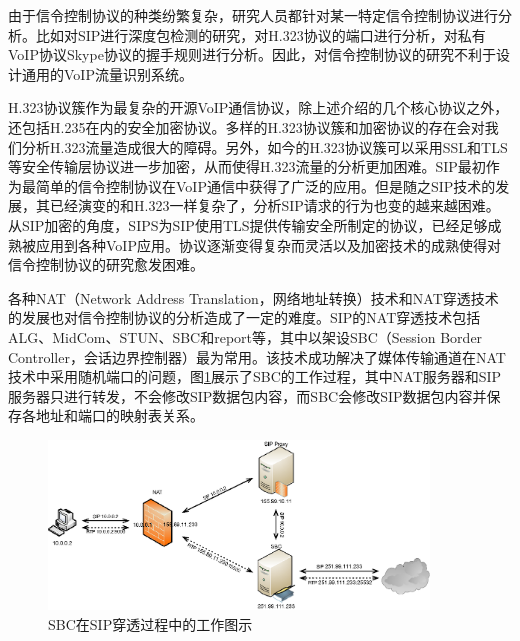 由于信令控制协议的种类纷繁复杂，研究人员都针对某一特定信令控制协议进行分析。比如对SIP进行深度包检测的研究，对H.323协议的端口进行分析，对私有VoIP协议Skype协议的握手规则进行分析。因此，对信令控制协议的研究不利于设计通用的VoIP流量识别系统。

H.323协议簇作为最复杂的开源VoIP通信协议，除上述介绍的几个核心协议之外，还包括H.235在内的安全加密协议。多样的H.323协议簇和加密协议的存在会对我们分析H.323流量造成很大的障碍。另外，如今的H.323协议簇可以采用SSL和TLS等安全传输层协议进一步加密，从而使得H.323流量的分析更加困难。SIP最初作为最简单的信令控制协议在VoIP通信中获得了广泛的应用。但是随之SIP技术的发展，其已经演变的和H.323一样复杂了，分析SIP请求的行为也变的越来越困难。从SIP加密的角度，SIPS为SIP使用TLS提供传输安全所制定的协议，已经足够成熟被应用到各种VoIP应用。协议逐渐变得复杂而灵活以及加密技术的成熟使得对信令控制协议的研究愈发困难。

各种NAT（Network Address Translation，网络地址转换）技术和NAT穿透技术的发展也对信令控制协议的分析造成了一定的难度。SIP的NAT穿透技术包括ALG、MidCom、STUN、SBC和report等，其中以架设SBC（Session Border Controller，会话边界控制器）最为常用。该技术成功解决了媒体传输通道在NAT技术中采用随机端口的问题，图\ref{fig:sbc}展示了SBC的工作过程，其中NAT服务器和SIP服务器只进行转发，不会修改SIP数据包内容，而SBC会修改SIP数据包内容并保存各地址和端口的映射表关系。

\begin{figure}[thb]
\begin{center}
\includegraphics[width=0.9\textwidth]{figures/sbc.eps}
\caption{SBC在SIP穿透过程中的工作图示}\label{fig:sbc}
\end{center}
\end{figure}

